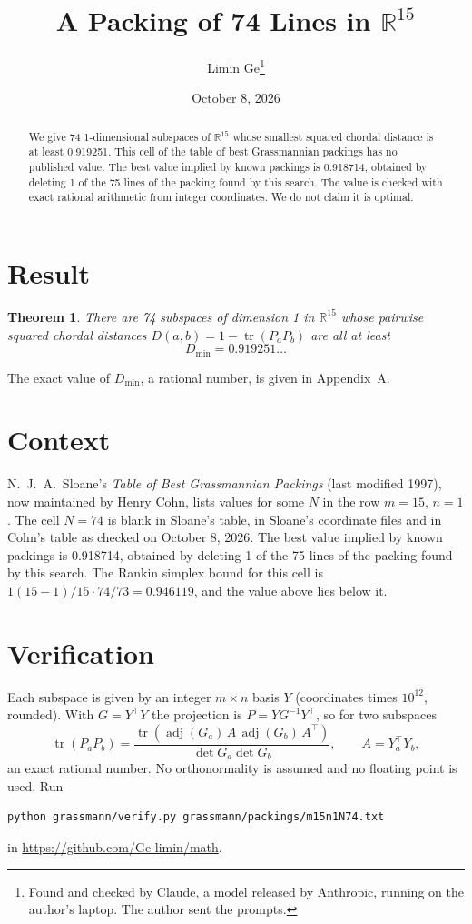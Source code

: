 \documentclass[11pt,a4paper]{article}
\title{A Packing of 74 Lines in $\mathbb{R}^{15}$}
\author{Limin Ge\thanks{Found and checked by Claude, a model released by Anthropic, running on the author's laptop. The author sent the prompts.}}
\date{October 8, 2026}
\newtheorem*{theorem}{Theorem}
\begin{document}
\maketitle
\begin{abstract}
We give 74 1-dimensional subspaces of $\mathbb{R}^{15}$ whose smallest squared chordal distance is at least 0.919251. This cell of the table of best Grassmannian packings has no published value. The best value implied by known packings is 0.918714, obtained by deleting 1 of the 75 lines of the packing found by this search. The value is checked with exact rational arithmetic from integer coordinates. We do not claim it is optimal.
\end{abstract}

\section{Result}
\begin{theorem}
There are 74 subspaces of dimension 1 in $\mathbb{R}^{15}$ whose pairwise squared chordal distances $D(a,b) = 1 - \operatorname{tr}(P_aP_b)$ are all at least
\[ D_{\min} = 0.919251\ldots \]
\end{theorem}
The exact value of $D_{\min}$, a rational number, is given in Appendix~A.


\section{Context}
N.~J.~A.~Sloane's \emph{Table of Best Grassmannian Packings} (last modified 1997), now maintained by Henry Cohn, lists values for some $N$ in the row $m=15$, $n=1$. The cell $N=74$ is blank in Sloane's table, in Sloane's coordinate files and in Cohn's table as checked on October 8, 2026. The best value implied by known packings is 0.918714, obtained by deleting 1 of the 75 lines of the packing found by this search. The Rankin simplex bound for this cell is $1(15-1)/15\cdot 74/73 = 0.946119$, and the value above lies below it.


\section{Verification}
Each subspace is given by an integer $m\times n$ basis $Y$ (coordinates times $10^{12}$, rounded). With $G=Y^\top Y$ the projection is $P=YG^{-1}Y^\top$, so for two subspaces
\[ \operatorname{tr}(P_aP_b)=\frac{\operatorname{tr}(\operatorname{adj}(G_a)\,A\,\operatorname{adj}(G_b)\,A^\top)}{\det G_a\det G_b},\qquad A=Y_a^\top Y_b, \]
an exact rational number. No orthonormality is assumed and no floating point is used. Run
\begin{verbatim}
python grassmann/verify.py grassmann/packings/m15n1N74.txt
\end{verbatim}
in \url{https://github.com/Ge-limin/math}.
\end{document}
